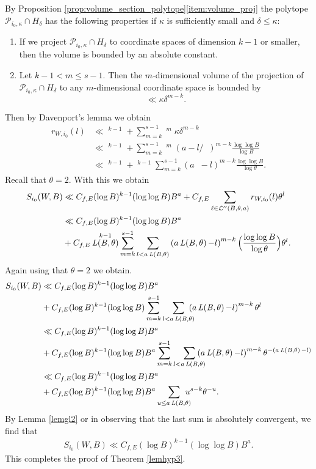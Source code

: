 \documentclass[JEP,XML,SOM,Unicode,published]{cedram}
\newenvironment{enumeratei}
{\bgroup\def\theenumi{\roman{enumi}}\def\theenumii{\arabic{enumii}}\begin{enumerate}}
{\end{enumerate}\egroup}
\DeclareMathOperator{\LBt}{\mathit{L(B,\theta)}}
\newcommand{\cLBta}{\calL''(B,\theta,a)}
\let\del\delta
\let\tet\theta
\newcommand{\calL}{\mathcal{L}}
\theoremstyle{definition}
\numberwithin{theorem}{section}
\begin{document}
By Proposition \ref{prop:volume_section_polytope}\eqref{item:volume_proj} the polytope $\mathcal{P}_{i_0,\kappa}\cap H_\del$ has the following properties if $\kappa$ is sufficiently small and $\del\leq \kappa$:
\begin{enumeratei}
\item
If we project $\mathcal{P}_{i_0,\kappa}\cap H_\del$ to coordinate spaces of dimension $k-1$ or smaller, then the volume is bounded by an absolute constant.
\item
Let $k-1< m\leq s-1$. Then the $m$-dimensional volume of the projection of $\mathcal{P}_{i_0,\kappa}\cap H_\del$ to any $m$-dimensional coordinate space is bounded by
\[
\ll \kappa \del^{m-k}.
\]
\end{enumeratei}
Then by Davenport's lemma \cite{davenport} we obtain
\begin{align*}
r_{W,i_0}(l)&\ll \LBt^{k-1} +\sum_{m=k}^{s-1} \LBt^{m} \kappa \del^{m-k} \\
&\ll \LBt^{k-1} + \sum_{m=k}^{s-1} \LBt^{m} \left(a-l/{\LBt}\right)^{m-k} \frac{\log\log B}{\log B}\\
&\ll \LBt^{k-1} +\LBt^{k-1}\sum_{m=k}^{s-1} \left(a\LBt-l\right)^{m-k} \frac{\log\log B}{\log \tet}.
\end{align*}
Recall that $\tet=2$. With this we obtain
\begin{align*}
S_{i_0}(W,B)&\ll C_{f,E} (\log B)^{k-1}(\log \log B) B^a + C_{f,E} \sum_{\ell\in\cLBta} r_{W,i_0}(l) \tet^l\\
&\ll C_{f,E} (\log B)^{k-1}(\log \log B) B^a \\
&+ C_{f,E} \LBt^{k-1}\sum_{m=k}^{s-1} \sum_{l< a\LBt} \left(a\LBt-l\right)^{m-k} \Bigl(\frac{\log\log B}{\log \tet} \Bigr) \tet^l.
\end{align*}
Again using that $\tet=2$ we obtain.
\begin{align*}
S_{i_0}(W,B)&\ll C_{f,E} (\log B)^{k-1}(\log \log B) B^a \\
&+ C_{f,E} (\log B)^{k-1}(\log \log B) \sum_{m=k}^{s-1} \sum_{l< a\LBt}\hspace*{-3mm}\left(a\LBt-l\right)^{m-k} \tet^l \\
&\ll C_{f,E} (\log B)^{k-1}(\log \log B) B^a \\
&+ C_{f,E} (\log B)^{k-1}(\log \log B)B^a \sum_{m=k}^{s-1} \sum_{l< a\LBt}\hspace*{-4mm}\left(a\LBt-l\right)^{m-k} \tet^{-(a \LBt - l)} \\
&\ll C_{f,E} (\log B)^{k-1}(\log \log B) B^a \\
&+C_{f,E} (\log B)^{k-1} (\log \log B) B^a \sum_{u\leq a\LBt}\hspace*{-3mm} u^{s-k} \tet^{-u}.
\end{align*}
By Lemma \ref{lemgl2} or in observing that the last sum is absolutely convergent, we find that
\begin{align*}
S_{i_0}(W,B)\ll C_{f,E} (\log B)^{k-1}(\log \log B) B^a.
\end{align*}
This completes the proof of Theorem \ref{lemhyp3}.
\end{document}
